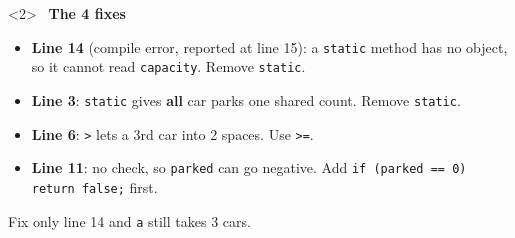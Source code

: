 \documentclass[aspectratio=169]{beamer}
\newcommand{\code}[1]{\texttt{#1}}
\newcommand{\goodlabel}[1]{\textcolor{goodgreen}{\ding{51}~\textbf{#1}}}
\begin{document}
\begin{frame}
\begin{columns}[T,onlytextwidth]
    \begin{onlyenv}<2>
    \goodlabel{The 4 fixes}
    \begin{itemize}[itemsep=0.25em, leftmargin=1em]
      \footnotesize
      \item \textbf{Line 14} (compile error, reported at line 15): a \code{static}
            method has no object, so it cannot read \code{capacity}. Remove
            \code{static}.
      \item \textbf{Line 3}: \code{static} gives \textbf{all} car parks one shared
            count. Remove \code{static}.
      \item \textbf{Line 6}: \code{>} lets a 3rd car into 2 spaces. Use \code{>=}.
      \item \textbf{Line 11}: no check, so \code{parked} can go negative. Add
            \code{if (parked == 0) return false;} first.
    \end{itemize}
    {\footnotesize Fix only line 14 and \code{a} still takes 3 cars.}
    \end{onlyenv}
  \end{columns}
\end{frame}
\end{document}
